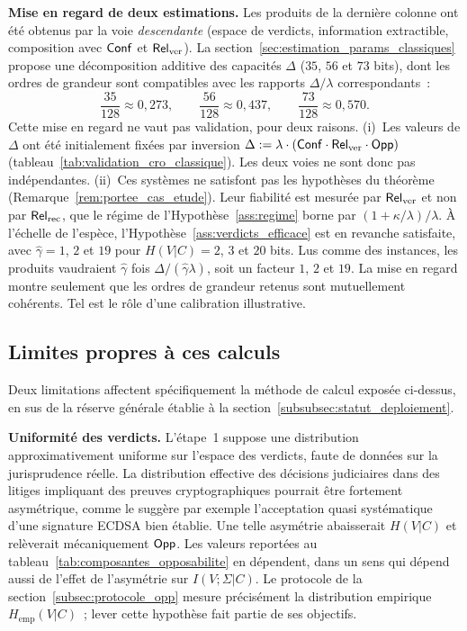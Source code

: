 \begin{sloppypar}
\noindent\textbf{Mise en regard de deux estimations.} Les produits de la
derni\`ere colonne ont \'et\'e obtenus par la voie \emph{descendante}
(espace de verdicts, information extractible, composition avec $\mathsf{Conf}$ et
$\mathsf{Rel}_{\mathrm{ver}}$). La section~\ref{sec:estimation_params_classiques} propose une
d\'ecomposition additive des capacit\'es $\Delta$ ($35$, $56$ et $73$
bits), dont les ordres de grandeur sont compatibles avec les rapports
$\Delta/\lambda$ correspondants~:
\begin{equation}
\frac{35}{128} \approx 0{,}273, \qquad
\frac{56}{128} \approx 0{,}437, \qquad
\frac{73}{128} \approx 0{,}570.
\label{eq:concordance_voies}
\end{equation}
Cette mise en regard ne vaut pas validation, pour deux raisons. (i)~Les valeurs de $\Delta$ ont
\'et\'e initialement fix\'ees par inversion $\Delta := \lambda\cdot(\mathsf{Conf}\cdot\mathsf{Rel}_{\mathrm{ver}}\cdot\mathsf{Opp})$
(tableau~\ref{tab:validation_cro_classique}). Les deux voies ne sont donc
pas ind\'ependantes. (ii)~Ces syst\`emes ne satisfont pas les hypoth\`eses du
th\'eor\`eme (Remarque~\ref{rem:portee_cas_etude}). Leur fiabilit\'e est mesur\'ee par $\mathsf{Rel}_{\mathrm{ver}}$ et non par
$\mathsf{Rel}_{\mathrm{rec}}$, que le r\'egime de l'Hypoth\`ese~\ref{ass:regime} borne par $(1+\kappa/\lambda)/\lambda$.
\`A l'\'echelle de l'esp\`ece, l'Hypoth\`ese~\ref{ass:verdicts_efficace}
est en revanche satisfaite, avec $\hat\gamma = 1$, $2$ et $19$ pour $H(V|C) = 2$, $3$ et $20$ bits. Lus comme des instances, les
produits vaudraient $\hat\gamma$ fois $\Delta/(\hat\gamma\lambda)$, soit un facteur $1$,
$2$ et $19$. La mise en regard montre seulement que les ordres de grandeur
retenus sont mutuellement coh\'erents. Tel est le r\^ole d'une calibration
illustrative.

\subsection{Limites propres \`a ces calculs}
\label{sec:limites_derivations}

Deux limitations affectent sp\'ecifiquement la m\'ethode de calcul expos\'ee
ci-dessus, en sus de la r\'eserve g\'en\'erale \'etablie \`a la
section~\ref{subsubsec:statut_deploiement}.

\noindent\textbf{Uniformit\'e des verdicts.} L'\'etape~1 suppose une
distribution approximativement uniforme sur l'espace des verdicts, faute de
donn\'ees sur la jurisprudence r\'eelle. La distribution effective des
d\'ecisions judiciaires dans des litiges impliquant des preuves
cryptographiques pourrait \^etre fortement asym\'etrique, comme le sugg\`ere par exemple l'acceptation
quasi syst\'ematique d'une signature ECDSA bien \'etablie. Une
telle asym\'etrie abaisserait $H(V|C)$ et rel\`everait m\'ecaniquement $\mathsf{Opp}$. Les
valeurs report\'ees au tableau~\ref{tab:composantes_opposabilite} en
d\'ependent, dans un sens qui d\'epend aussi de l'effet de l'asym\'etrie sur
$I(V;\Sigma|C)$. Le protocole de la
section~\ref{subsec:protocole_opp} mesure pr\'ecis\'ement la distribution
empirique $H_{\mathrm{emp}}(V|C)$~; lever cette hypoth\`ese fait partie de ses
objectifs.


\end{sloppypar}
